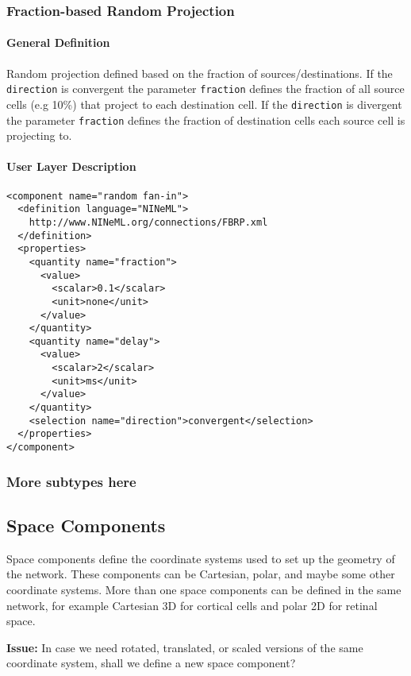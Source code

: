 \documentclass{article}
\newcommand{\issue}[1]{%
\begin{center}
\colorbox{issuecolor}{\parbox{0.8\linewidth}{\textbf{Issue:} #1}}
\end{center}%
}
\begin{document}
\subsubsection{Fraction-based Random Projection}

\paragraph{General Definition}
Random projection defined based on the fraction of sources/destinations. If
the {\tt direction} is convergent the parameter {\tt fraction} defines the fraction
of all source cells (e.g 10\%) that project to each destination cell. If the
{\tt direction} is divergent the parameter {\tt fraction} defines the fraction of
destination cells each source cell is projecting to.

\paragraph{User Layer Description}
\begin{verbatim}
<component name="random fan-in">
  <definition language="NINeML">
    http://www.NINeML.org/connections/FBRP.xml
  </definition>
  <properties>
    <quantity name="fraction">
      <value>
        <scalar>0.1</scalar>
        <unit>none</unit>
      </value>
    </quantity>
    <quantity name="delay">
      <value>
        <scalar>2</scalar>
        <unit>ms</unit>
      </value>
    </quantity>
    <selection name="direction">convergent</selection>
  </properties>
</component>
\end{verbatim}

\subsubsection{More subtypes here}

\subsection{Space Components}

Space components define the coordinate systems used to set up the geometry of the
network. These components can be Cartesian, polar, and maybe some other coordinate
systems. More than one space components can be defined in the same network, for
example Cartesian 3D for cortical cells and polar 2D for retinal space.

\issue{In case we need rotated, translated, or scaled versions of the same
coordinate system, shall we define a new space component?}
\end{document}
